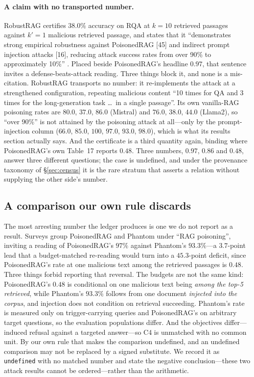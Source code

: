 \documentclass[11pt]{article}
\begin{document}
\paragraph{A claim with no transported number.}
RobustRAG certifies $38.0\%$ accuracy on RQA at $k=10$ retrieved passages
against $k'=1$ malicious retrieved passage, and states that it ``demonstrates
strong empirical robustness against PoisonedRAG [45] and indirect prompt
injection attacks [16], reducing attack success rates from over 90\% to
approximately 10\%'' \citep{certifiedRAG2024}. Placed beside PoisonedRAG's
headline $0.97$, that sentence invites a defense-beats-attack reading. Three
things block it, and none is a mis-citation. RobustRAG transports no number: it
re-implements the attack at a strengthened configuration, repeating malicious
content ``10 times for QA and 3 times for the long-generation task \dots\ in a
single passage''. Its own vanilla-RAG poisoning rates are $80.0$, $37.0$, $86.0$
(Mistral) and $76.0$, $38.0$, $44.0$ (Llama2), so ``over 90\%'' is not attained
by the poisoning attack at all---only by the prompt-injection column ($66.0$,
$85.0$, $100$, $97.0$, $93.0$, $98.0$), which is what its results section
actually says. And the certificate is a third quantity again, binding where
PoisonedRAG's own Table~17 reports $0.48$. Three numbers, $0.97$, $0.86$ and
$0.48$, answer three different questions; the case is undefined, and under the
provenance taxonomy of \S\ref{sec:census} it is the rare stratum that asserts a
relation without supplying the other side's number.

\subsection{A comparison our own rule discards}
\label{sec:discarded}

The most arresting number the ledger produces is one we do not report as a
result. Surveys group PoisonedRAG and Phantom under ``RAG poisoning'', inviting
a reading of PoisonedRAG's $97\%$ against Phantom's $93.3\%$---a $3.7$-point
lead that a budget-matched re-reading would turn into a $45.3$-point deficit,
since PoisonedRAG's rate at one malicious text among the retrieved passages is
$0.48$. Three things forbid reporting that reversal. The budgets are not the
same kind: PoisonedRAG's $0.48$ is conditional on one malicious text being
\emph{among the top-5 retrieved}, while Phantom's $93.3\%$ follows from one
document \emph{injected into the corpus}, and injection does not condition on
retrieval succeeding. Phantom's rate is measured only on trigger-carrying
queries and PoisonedRAG's on arbitrary target questions, so the evaluation
populations differ. And the objectives differ---induced refusal against a
targeted answer---so C4 is unmatched with no common unit. By our own rule that
makes the comparison undefined, and an undefined comparison may not be replaced
by a signed substitute. We record it as \texttt{undefined} with no matched
number and state the negative conclusion---these two attack results cannot be
ordered---rather than the arithmetic.
\end{document}
